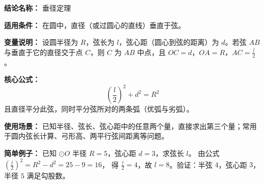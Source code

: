 \textbf{结论名称：} 垂径定理

\textbf{适用条件：} 在圆中，直径（或过圆心的直线）垂直于弦。

\textbf{变量说明：} 设圆半径为 \(R\)，弦长为 \(l\)，弦心距（圆心到弦的距离）为 \(d\)。若弦 \(AB\) 与垂直于它的直径交于点 \(C\)，则 \(C\) 为 \(AB\) 中点，且 \(OC = d\)，\(OA = R\)，\(AC = \frac{l}{2}\)。

\textbf{核心公式：} 
\[
\boxed{\left(\frac{l}{2}\right)^2 + d^2 = R^2}
\]
且直径平分此弦，同时平分弦所对的两条弧（优弧与劣弧）。

\textbf{使用场景：} 已知半径、弦长、弦心距中的任意两个量，直接求出第三个量；常用于圆内弦长计算、弓形高、两平行弦间距离等问题。

\textbf{简单例子：} 已知 \(\odot O\) 半径 \(R = 5\)，弦心距 \(d = 3\)，求弦长 \(l\)。
由公式 \(\left(\frac{l}{2}\right)^2 = R^2 - d^2 = 25 - 9 = 16\)，
得 \(\frac{l}{2} = 4\)，故 \(l = 8\)。验证：半弦 \(4\)，弦心距 \(3\)，半径 \(5\) 满足勾股数。